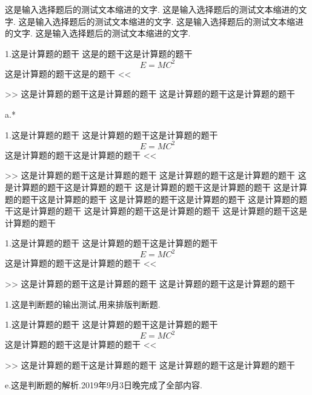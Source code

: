 \documentclass[a4paper,fontset = windowsnew]{ctexbook}
\begin{document}
这是输入选择题后的测试文本缩进的文字.
这是输入选择题后的测试文本缩进的文字.
这是输入选择题后的测试文本缩进的文字.
这是输入选择题后的测试文本缩进的文字.
这是输入选择题后的测试文本缩进的文字.
\newpage
\begin{blanks}
1.这是计算题的题干
这是的题干这是计算题的题干
\begin{equation}
  E=MC^2
\end{equation}
这是计算题的题干这是的题干
<<
>>
这是计算题的题干这是计算题的题干
这是计算题的题干这是计算题的题干

a.*

1.这是计算题的题干
这是计算题的题干这是计算题的题干
\begin{equation}
  E=MC^2
\end{equation}
这是计算题的题干这是计算题的题干
<<
>>
这是计算题的题干这是计算题的题干
这是计算题的题干这是计算题的题干
这是计算题的题干这是计算题的题干
这是计算题的题干这是计算题的题干
这是计算题的题干这是计算题的题干
这是计算题的题干这是计算题的题干
这是计算题的题干这是计算题的题干
这是计算题的题干这是计算题的题干
这是计算题的题干这是计算题的题干
  
1.这是计算题的题干
这是计算题的题干这是计算题的题干
\begin{equation}
  E=MC^2
\end{equation}
这是计算题的题干这是计算题的题干
<<
>>
这是计算题的题干这是计算题的题干
这是计算题的题干这是计算题的题干

\end{blanks}


\newpage

\begin{judgements}
  1.这是判断题的输出测试,用来排版判断题.

1.这是计算题的题干
这是计算题的题干这是计算题的题干
\begin{equation}
  E=MC^2
\end{equation}
这是计算题的题干这是计算题的题干
<<
>>
这是计算题的题干这是计算题的题干
这是计算题的题干这是计算题的题干

e.这是判断题的解析.2019年9月3日晚完成了全部内容.

\end{judgements}
\end{document}
